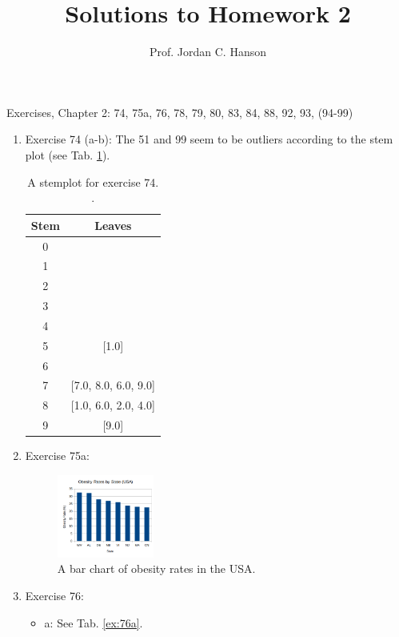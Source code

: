 \documentclass{article}
\begin{document}
\title{Solutions to Homework 2}
\author{Prof. Jordan C. Hanson}

\maketitle

Exercises, Chapter 2: 74, 75a, 76, 78, 79, 80, 83, 84, 88, 92, 93, (94-99)

\begin{enumerate}
\item Exercise 74 (a-b): The 51 and 99 seem to be outliers according to the stem plot (see Tab. \ref{tab:ex74}).
\begin{table}[ht]
\centering
\begin{tabular}{| c | c |}
\hline
\hline
Stem & Leaves \\ \hline
0 &   \\ \hline
1 &   \\ \hline
2 &   \\ \hline
3 &   \\ \hline
4 &   \\ \hline
5 & [1.0] \\ \hline
6 &   \\ \hline
7 & [7.0, 8.0, 6.0, 9.0] \\ \hline
8 & [1.0, 6.0, 2.0, 4.0] \\ \hline
9 & [9.0] \\ \hline
\hline
\end{tabular}
\caption{A stemplot for exercise 74. \label{tab:ex74}.}
\end{table}
\item Exercise 75a:
\begin{figure}[ht]
\centering
\includegraphics[width=0.3\textwidth]{figures/obesity.png}
\caption{\label{fig:ex75} A bar chart of obesity rates in the USA.}
\end{figure}
\item Exercise 76:
\begin{itemize}
\item a: See Tab. \ref{ex:76a}.
\begin{table}[ht]
\centering
\begin{tabular}{| c | c | c |}

\end{tabular}
\end{table}
\end{itemize}
\end{enumerate}
\end{document}
